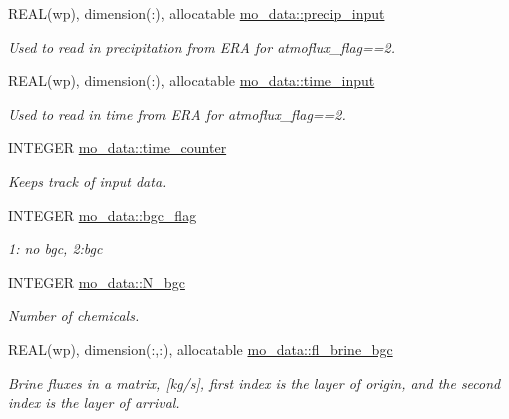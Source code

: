 \begin{DoxyCompactItemize}
REAL(wp), dimension(:), allocatable \hyperlink{namespacemo__data_ae066ba3be89578a239547e88eaa6c45e}{mo\_\-data::precip\_\-input}
\begin{DoxyCompactList}\small\item\em Used to read in precipitation from ERA for atmoflux\_\-flag==2. \item\end{DoxyCompactList}\item 
REAL(wp), dimension(:), allocatable \hyperlink{namespacemo__data_af2146601cc78d09fe2b51e065684822b}{mo\_\-data::time\_\-input}
\begin{DoxyCompactList}\small\item\em Used to read in time from ERA for atmoflux\_\-flag==2. \item\end{DoxyCompactList}\item 
INTEGER \hyperlink{namespacemo__data_acabfab1b812c7dd4f73b2ec6b059cae1}{mo\_\-data::time\_\-counter}
\begin{DoxyCompactList}\small\item\em Keeps track of input data. \item\end{DoxyCompactList}\item 
INTEGER \hyperlink{namespacemo__data_a962bc540d1c63b9ff3b571c91133070b}{mo\_\-data::bgc\_\-flag}
\begin{DoxyCompactList}\small\item\em 1: no bgc, 2:bgc \item\end{DoxyCompactList}\item 
INTEGER \hyperlink{namespacemo__data_a25de952ac1cfddcf1328f99e9e490ed3}{mo\_\-data::N\_\-bgc}
\begin{DoxyCompactList}\small\item\em Number of chemicals. \item\end{DoxyCompactList}\item 
REAL(wp), dimension(:,:), allocatable \hyperlink{namespacemo__data_a5fbc3eddb21dfefcbd20b3f95b2e9808}{mo\_\-data::fl\_\-brine\_\-bgc}
\begin{DoxyCompactList}\small\item\em Brine fluxes in a matrix, \mbox{[}kg/s\mbox{]}, first index is the layer of origin, and the second index is the layer of arrival. \item\end{DoxyCompactList}\item 

\end{DoxyCompactItemize}
